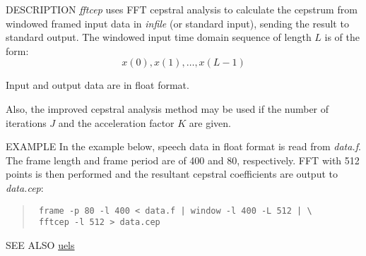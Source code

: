 \begin{synopsis}
\item[fftcep] [ --m $M$ ] [ --l $L$ ] [ --j $J$ ] [ --k $K$ ] 
	    [ --e $E$ ] [ {\em infile} ] 
\end{synopsis}

\begin{qsection}{DESCRIPTION}
{\em fftcep} uses FFT cepstral analysis to calculate the cepstrum 
from windowed framed input data in {\em infile} (or standard input), 
sending the result to standard output.
The windowed input time domain sequence of length $L$ is of the form:
\begin{displaymath}
  x(0),x(1),\dots,x(L-1)
\end{displaymath}
\par
Input and output data are in float format.
\par
Also, the improved cepstral analysis method \cite{ref:icep-IECE} may be used if the
number of iterations $J$ and the acceleration factor $K$ are given.
\end{qsection}

\begin{options}
\end{options}

\begin{qsection}{EXAMPLE}
In the example below, speech data in float format is read from {\em data.f}.  The
frame length and frame period are of 400 and 80, respectively.
FFT with 512 points is then performed and
the resultant cepstral coefficients are output to {\em data.cep}:
\begin{quote}
  \verb! frame -p 80 -l 400 < data.f | window -l 400 -L 512 | \! \\
  \verb! fftcep -l 512 > data.cep!
\end{quote}
\end{qsection}

\begin{qsection}{SEE ALSO}
\hyperlink{uels}{uels}
\end{qsection}

